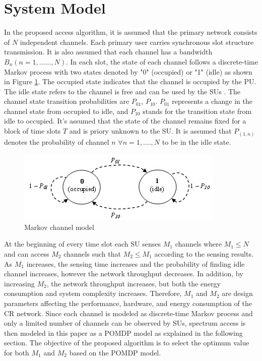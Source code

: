 \documentclass[twocolumn]{el-author}
\begin{document}
	
	
	
	\section{System Model}
	
	In the proposed access algorithm, it is assumed that the primary network consists of $N$ independent channels. Each primary user carries synchronous slot structure transmission. It is also assumed that each channel has a bandwidth $B_n (n=1,\dots \dots ,N)$.  In each slot, the state of each channel follows a discrete-time Markov process with two states denoted by "0" (occupied) or "1" (idle) as shown in Figure \ref{fig:pomdp}. The occupied state indicates that the channel is occupied by the PU. The idle state refers to the channel is free and can be used by the SUs \cite{Choi2011,Masrub2012,Zhao2007}. The channel state transition probabilities are $P_{01}$, $P_{10}$. $P_{01}$ represents a change in the channel state from occupied to idle, and $P_{10}$ stands for the transition state from idle to occupied. It's assumed that the state of the channel remains fixed for a block of time slots $T$ and is priory unknown to the SU. It is assumed that $P_{(1,n)}$ denotes the probability of channel $n$  $ \forall {n=1,\dots .,N}$ to be in the idle state.
	\begin{figure}[h]
				\centering
				\includegraphics[width=0.7\columnwidth]{./pomdp.jpg}
				\caption{Markov channel model}
				\label{fig:pomdp}
			\end{figure}
	At the beginning of every  time slot each SU senses $M_1$ channels where $M_1 \le N$ and can access $M_2$ channels such that $M_2\le M_1$ according to the sensing results. As $M_1$ increases, the sensing time increases and the probability of finding idle channel increases, however the network throughput decreases. In addition, by increasing $M_2$, the network throughput increases, but both the energy consumption and system complexity increases. Therefore, $M_1$ and $M_2$ are design parameters affecting the performance, hardware, and energy consumption of the CR network. Since each channel is modeled as discrete-time Markov process and only a limited number of channels can be observed by SUs, spectrum access is then modeled in this paper as a POMDP model as explained in the following section. The objective of the proposed algorithm is to select the optimum value for both $M_1$ and $M_2$ based on the POMDP model. 
	
\end{document}
